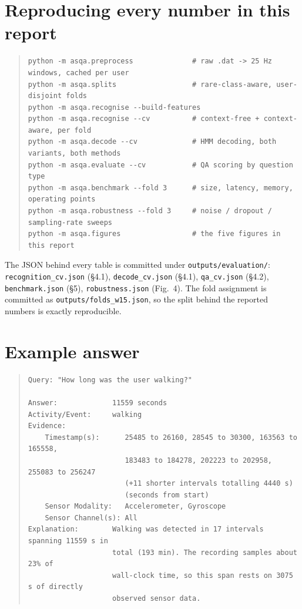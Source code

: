 \documentclass[11pt,a4paper]{article}
\newcommand{\code}[1]{\texttt{\small #1}}
\begin{document}
\appendix
\section{Reproducing every number in this report}

\begin{quote}\small
\begin{verbatim}
python -m asqa.preprocess              # raw .dat -> 25 Hz windows, cached per user
python -m asqa.splits                  # rare-class-aware, user-disjoint folds
python -m asqa.recognise --build-features
python -m asqa.recognise --cv          # context-free + context-aware, per fold
python -m asqa.decode --cv             # HMM decoding, both variants, both methods
python -m asqa.evaluate --cv           # QA scoring by question type
python -m asqa.benchmark --fold 3      # size, latency, memory, operating points
python -m asqa.robustness --fold 3     # noise / dropout / sampling-rate sweeps
python -m asqa.figures                 # the five figures in this report
\end{verbatim}
\end{quote}

\noindent The JSON behind every table is committed under \code{outputs/evaluation/}:
\code{recognition\_cv.json} (\S4.1), \code{decode\_cv.json} (\S4.1),
\code{qa\_cv.json} (\S4.2), \code{benchmark.json} (\S5), \code{robustness.json}
(Fig.~4). The fold assignment is committed as \code{outputs/folds\_w15.json}, so the
split behind the reported numbers is exactly reproducible.

\section{Example answer}

\begin{quote}\small
\begin{verbatim}
Query: "How long was the user walking?"

Answer:             11559 seconds
Activity/Event:     walking
Evidence:
    Timestamp(s):      25485 to 26160, 28545 to 30300, 163563 to 165558,
                       183483 to 184278, 202223 to 202958, 255083 to 256247
                       (+11 shorter intervals totalling 4440 s)
                       (seconds from start)
    Sensor Modality:   Accelerometer, Gyroscope
    Sensor Channel(s): All
Explanation:        Walking was detected in 17 intervals spanning 11559 s in
                    total (193 min). The recording samples about 23% of
                    wall-clock time, so this span rests on 3075 s of directly
                    observed sensor data.
\end{verbatim}
\end{quote}
\end{document}
